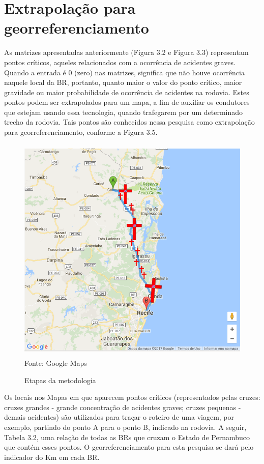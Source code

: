 \vspace{10mm}

\section{Extrapolação para georreferenciamento}

As matrizes apresentadas anteriormente (Figura 3.2 e Figura 3.3) representam pontos críticos, aqueles relacionados com a ocorrência de acidentes graves. Quando a entrada é 0 (zero) nas matrizes, significa que não houve ocorrência naquele local da BR, portanto, quanto maior o valor do ponto crítico, maior gravidade ou maior probabilidade de ocorrência de acidentes na rodovia. 
Estes pontos podem ser extrapolados para um mapa, a fim de auxiliar os condutores que estejam usando essa tecnologia, quando trafegarem por um determinado trecho da rodovia. Tais pontos são conhecidos nessa pesquisa como extrapolação para georreferenciamento, conforme a Figura 3.5.

\begin{figure}[ht]
	\centering
	\caption{Etapas da metodologia}
	\includegraphics[width=150mm, height=110mm]{Figuras/Metodologia/georreferenciamento.png}\\
	\tiny Fonte: Google Maps
\end{figure}


\pagebreak

Os locais nos Mapas em que aparecem pontos críticos (representados pelas cruzes: cruzes grandes - grande concentração de acidentes graves; cruzes pequenas - demais acidentes) são utilizados para traçar o roteiro de uma viagem, por exemplo, partindo do ponto A para o ponto B, indicado na rodovia. 
A seguir, Tabela 3.2, uma relação de todas as BRs que cruzam o Estado de Pernambuco que contém esses pontos. 
O georreferenciamento para esta pesquisa se dará pelo indicador do Km em cada BR.

